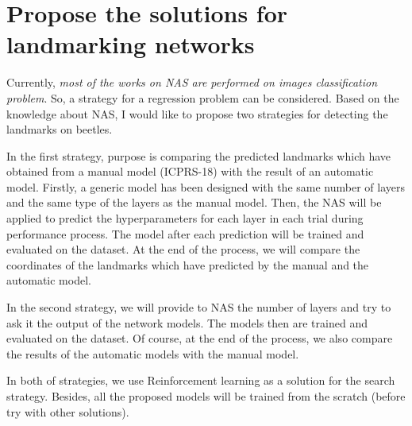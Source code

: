 \documentclass[12pt,a4paper]{article}
\begin{document}
\section{Propose the solutions for landmarking networks}
Currently, \textit{most of the works on NAS are performed on images classification problem}. So, a strategy for a regression problem can be considered. Based on the knowledge about NAS, I would like to propose two strategies for detecting the landmarks on beetles.

In the first strategy, purpose is comparing the predicted landmarks which have obtained from a manual model (ICPRS-18) with the result of an automatic model. Firstly, a generic model has been designed with the same number of layers and the same type of the layers as the manual model. Then, the NAS will be applied to predict the hyperparameters for each layer in each trial during performance process. The model after each prediction will be trained and evaluated on the dataset. At the end of the process, we will compare the coordinates of the landmarks which have predicted by the manual and the automatic model.

In the second strategy, we will provide to NAS the number of layers and try to ask it the output of the network models. The models then are trained and evaluated on the dataset. Of course, at the end of the process, we also compare the results of the automatic models with the manual model.

In both of strategies, we use Reinforcement learning as a solution for the search strategy. Besides, all the proposed models will be trained from the scratch (before try with other solutions).


\pagebreak
\end{document}

